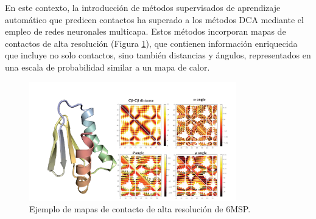 En este contexto, la introducción de métodos supervisados de aprendizaje automático que predicen contactos ha superado a los métodos DCA mediante el empleo de redes neuronales multicapa. Estos métodos incorporan mapas de contactos de alta resolución (Figura \ref{fig:highresmaps}), que contienen información enriquecida que incluye no solo contactos, sino también distancias y ángulos, representados en una escala de probabilidad similar a un mapa de calor.

\begin{figure}[h]
\centering
\includegraphics[width = 0.8\textwidth]{figs/high_res_maps.png}
\caption{Ejemplo de mapas de contacto de alta resolución de 6MSP.}
\label{fig:highresmaps}
\end{figure}